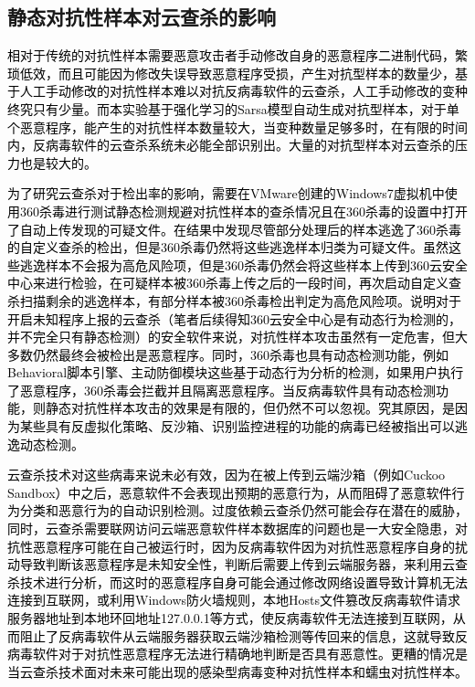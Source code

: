 \subsection{静态对抗性样本对云查杀的影响}

\textcolor{black}{相对于传统的对抗性样本需要恶意攻击者手动修改自身的恶意程序二进制代码，繁琐低效，而且可能因为修改失误导致恶意程序受损，产生对抗型样本的数量少，基于人工手动修改的对抗性样本难以对抗反病毒软件的云查杀，人工手动修改的变种终究只有少量。而本实验基于强化学习的Sarsa模型自动生成对抗型样本，对于单个恶意程序，能产生的对抗性样本数量较大，当变种数量足够多时，在有限的时间内，反病毒软件的云查杀系统未必能全部识别出。大量的对抗型样本对云查杀的压力也是较大的。}

\textcolor{black}{为了研究云查杀对于检出率的影响，需要在VMware创建的Windows7虚拟机中使用360杀毒进行测试静态检测规避对抗性样本的查杀情况且在360杀毒的设置中打开了自动上传发现的可疑文件。在结果中发现尽管部分处理后的样本逃逸了360杀毒的自定义查杀的检出，但是360杀毒仍然将这些逃逸样本归类为可疑文件。虽然这些逃逸样本不会报为高危风险项，但是360杀毒仍然会将这些样本上传到360云安全中心来进行检验，在可疑样本被360杀毒上传之后的一段时间，再次启动自定义查杀扫描剩余的逃逸样本，有部分样本被360杀毒检出判定为高危风险项。说明对于开启未知程序上报的云查杀（笔者后续得知360云安全中心是有动态行为检测的，并不完全只有静态检测）的安全软件来说，对抗性样本攻击虽然有一定危害，但大多数仍然最终会被检出是恶意程序。同时，360杀毒也具有动态检测功能，例如Behavioral脚本引擎、主动防御模块这些基于动态行为分析的检测，如果用户执行了恶意程序，360杀毒会拦截并且隔离恶意程序。当反病毒软件具有动态检测功能，则静态对抗性样本攻击的效果是有限的，但仍然不可以忽视。究其原因，是因为某些具有反虚拟化策略、反沙箱、识别监控进程的功能的病毒已经被指出可以逃逸动态检测。\cite{ref33}\cite{ref34}\cite{ref35}\cite{ref36}}

\textcolor{black}{云查杀技术对这些病毒来说未必有效，因为在被上传到云端沙箱（例如Cuckoo Sandbox）中之后，恶意软件不会表现出预期的恶意行为，从而阻碍了恶意软件行为分类和恶意行为的自动识别检测。过度依赖云查杀仍然可能会存在潜在的威胁，同时，云查杀需要联网访问云端恶意软件样本数据库的问题也是一大安全隐患，对抗性恶意程序可能在自己被运行时，因为反病毒软件因为对抗性恶意程序自身的扰动导致判断该恶意程序是未知安全性，判断后需要上传到云端服务器，来利用云查杀技术进行分析，而这时的恶意程序自身可能会通过修改网络设置导致计算机无法连接到互联网，或利用Windows防火墙规则，本地Hosts文件篡改反病毒软件请求服务器地址到本地环回地址127.0.0.1等方式，使反病毒软件无法连接到互联网，从而阻止了反病毒软件从云端服务器获取云端沙箱检测等传回来的信息，这就导致反病毒软件对于对抗性恶意程序无法进行精确地判断是否具有恶意性。更糟的情况是当云查杀技术面对未来可能出现的感染型病毒变种对抗性样本和蠕虫对抗性样本。}

